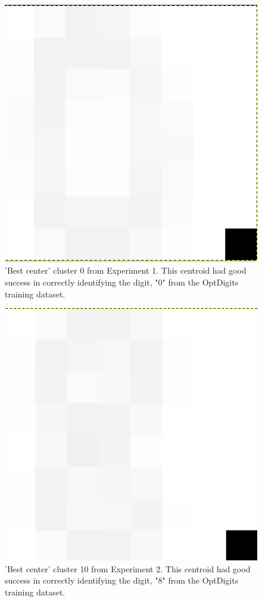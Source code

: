 \documentclass[12pt]{article}
\begin{document}
\begin{figure}
   	\begin{center}
   		\includegraphics[scale=0.5]{Screenshot_Exp1dig0}
   		\caption{'Best center' cluster 0 from Experiment 1. This centroid had good success in correctly identifying the digit, "0" from the OptDigits training dataset. }
   		\label{fig:a1}
   	\end{center}
   \end{figure}
   
\begin{figure}
   	\begin{center}
   		\includegraphics[scale=0.5]{Screenshot_Exp2dig10}
   		\caption{'Best center' cluster 10 from Experiment 2. This centroid had good success in correctly identifying the digit, "8" from the OptDigits training dataset.}
   		\label{fig:a2}
   	\end{center}
   \end{figure} 
   
\end{document}
